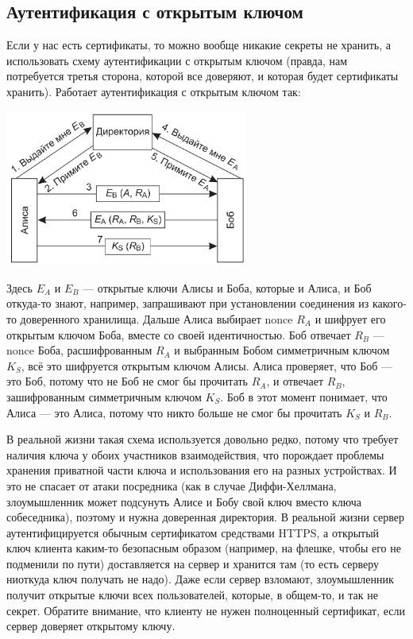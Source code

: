 \documentclass{../mcstext}
\begin{document}
\subsection{Аутентификация с открытым ключом}

Если у нас есть сертификаты, то можно вообще никакие секреты не хранить, а использовать схему аутентификации с открытым ключом (правда, нам потребуется третья сторона, которой все доверяют, и которая будет сертификаты хранить). Работает аутентификация с открытым ключом так:

\begin{center}
    \includegraphics[width=0.6\textwidth]{openKeyAuthentication.png}
\end{center}

Здесь $E_A$ и $E_B$ --- открытые ключи Алисы и Боба, которые и Алиса, и Боб откуда-то знают, например, запрашивают при установлении соединения из какого-то доверенного хранилища. Дальше Алиса выбирает nonce $R_A$ и шифрует его открытым ключом Боба, вместе со своей идентичностью. Боб отвечает $R_B$ --- nonce Боба, расшифрованным $R_A$ и выбранным Бобом симметричным ключом $K_S$, всё это шифруется открытым ключом Алисы. Алиса проверяет, что Боб --- это Боб, потому что не Боб не смог бы прочитать $R_A$, и отвечает $R_B$, зашифрованным симметричным ключом $K_S$. Боб в этот момент понимает, что Алиса --- это Алиса, потому что никто больше не смог бы прочитать $K_S$ и $R_B$.

В реальной жизни такая схема используется довольно редко, потому что требует наличия ключа у обоих участников взаимодействия, что порождает проблемы хранения приватной части ключа и использования его на разных устройствах. И это не спасает от атаки посредника (как в случае Диффи-Хеллмана, злоумышленник может подсунуть Алисе и Бобу свой ключ вместо ключа собеседника), поэтому и нужна доверенная директория. В реальной жизни сервер аутентифицируется обычным сертификатом средствами HTTPS, а открытый ключ клиента каким-то безопасным образом (например, на флешке, чтобы его не подменили по пути) доставляется на сервер и хранится там (то есть серверу ниоткуда ключ получать не надо). Даже если сервер взломают, злоумышленник получит открытые ключи всех пользователей, которые, в общем-то, и так не секрет. Обратите внимание, что клиенту не нужен полноценный сертификат, если сервер доверяет открытому ключу.
\end{document}
